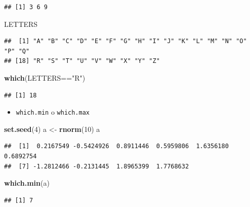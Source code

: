 \documentclass[]{article}
\def\tightlist{}
\newenvironment{Shaded}{\begin{snugshade}}{\end{snugshade}}
\newcommand{\KeywordTok}[1]{\textcolor[rgb]{0.13,0.29,0.53}{\textbf{{#1}}}}
\newcommand{\DecValTok}[1]{\textcolor[rgb]{0.00,0.00,0.81}{{#1}}}
\newcommand{\StringTok}[1]{\textcolor[rgb]{0.31,0.60,0.02}{{#1}}}
\newcommand{\NormalTok}[1]{{#1}}
\numberwithin{equation}{section}
\begin{document}
\begin{verbatim}
## [1] 3 6 9
\end{verbatim}

\begin{Shaded}
\begin{Highlighting}[]
\NormalTok{LETTERS}
\end{Highlighting}
\end{Shaded}

\begin{verbatim}
##  [1] "A" "B" "C" "D" "E" "F" "G" "H" "I" "J" "K" "L" "M" "N" "O" "P" "Q"
## [18] "R" "S" "T" "U" "V" "W" "X" "Y" "Z"
\end{verbatim}

\begin{Shaded}
\begin{Highlighting}[]
\KeywordTok{which}\NormalTok{(LETTERS==}\StringTok{"R"}\NormalTok{)}
\end{Highlighting}
\end{Shaded}

\begin{verbatim}
## [1] 18
\end{verbatim}

\begin{itemize}
\tightlist
\item
  \texttt{which.min} o \texttt{which.max}
\end{itemize}

\begin{Shaded}
\begin{Highlighting}[]
\KeywordTok{set.seed}\NormalTok{(}\DecValTok{4}\NormalTok{)}
\NormalTok{a <-}\StringTok{ }\KeywordTok{rnorm}\NormalTok{(}\DecValTok{10}\NormalTok{)}
\NormalTok{a}
\end{Highlighting}
\end{Shaded}

\begin{verbatim}
##  [1]  0.2167549 -0.5424926  0.8911446  0.5959806  1.6356180  0.6892754
##  [7] -1.2812466 -0.2131445  1.8965399  1.7768632
\end{verbatim}

\begin{Shaded}
\begin{Highlighting}[]
\KeywordTok{which.min}\NormalTok{(a)}
\end{Highlighting}
\end{Shaded}

\begin{verbatim}
## [1] 7
\end{verbatim}
\end{document}
